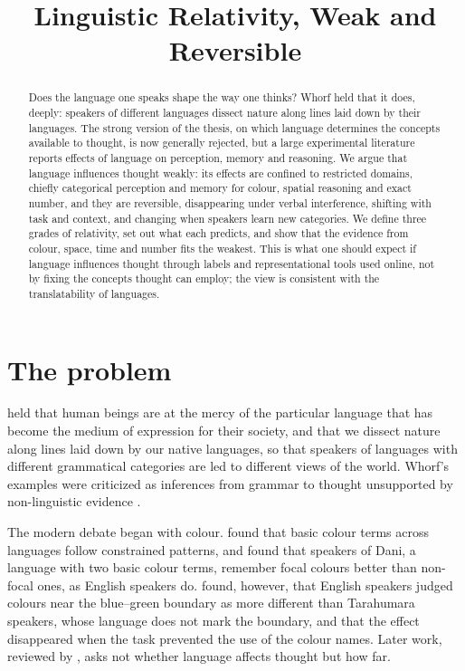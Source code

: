 \documentclass{situationist-preprint}
\title{Linguistic Relativity, Weak and Reversible}
\begin{document}
\maketitle

\begin{abstract}
Does the language one speaks shape the way one thinks? Whorf held that it does, deeply: speakers of different languages dissect nature along lines laid down by their languages. The strong version of the thesis, on which language determines the concepts available to thought, is now generally rejected, but a large experimental literature reports effects of language on perception, memory and reasoning. We argue that language influences thought weakly: its effects are confined to restricted domains, chiefly categorical perception and memory for colour, spatial reasoning and exact number, and they are reversible, disappearing under verbal interference, shifting with task and context, and changing when speakers learn new categories. We define three grades of relativity, set out what each predicts, and show that the evidence from colour, space, time and number fits the weakest. This is what one should expect if language influences thought through labels and representational tools used online, not by fixing the concepts thought can employ; the view is consistent with the translatability of languages.
\end{abstract}

\section{The problem}

\citet{Sapir1929} held that human beings are at the mercy of the particular language that has become the medium of expression for their society, and \citet{Whorf1956} that we dissect nature along lines laid down by our native languages, so that speakers of languages with different grammatical categories are led to different views of the world. Whorf's examples were criticized as inferences from grammar to thought unsupported by non-linguistic evidence \citep{Pinker1994}.

The modern debate began with colour. \citet{BerlinKay1969} found that basic colour terms across languages follow constrained patterns, and \citet{Heider1972} found that speakers of Dani, a language with two basic colour terms, remember focal colours better than non-focal ones, as English speakers do.  \citet{KayKempton1984} found, however, that English speakers judged colours near the blue--green boundary as more different than Tarahumara speakers, whose language does not mark the boundary, and that the effect disappeared when the task prevented the use of the colour names. Later work, reviewed by \citet{WolffHolmes2011}, asks not whether language affects thought but how far.
\end{document}
